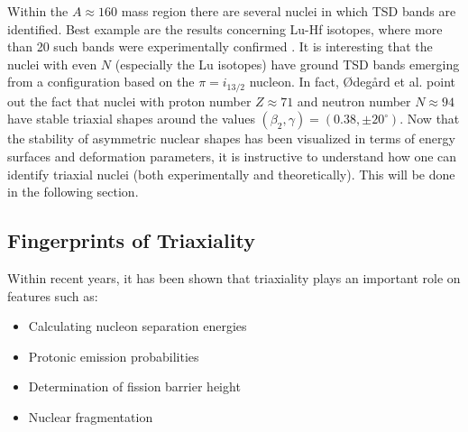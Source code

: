 Within the $A\approx160$ mass region there are several nuclei in which TSD bands are identified. Best example are the results concerning Lu-Hf isotopes, where more than 20 such bands were experimentally confirmed \cite{gu2007theoretical}. It is interesting that the nuclei with even $N$ (especially the Lu isotopes) have ground TSD bands emerging from a configuration based on the $\pi=i_{13/2}$ nucleon. In fact, Ødegård et al. \cite{odegaard2001evidence} point out the fact that nuclei with proton number $Z\approx 71$ and neutron number $N\approx 94$ have stable triaxial shapes around the values $(\beta_2,\gamma)=(0.38,\pm 20^\circ)$.
Now that the stability of asymmetric nuclear shapes has been visualized in terms of energy surfaces and deformation parameters, it is instructive to understand how one can identify triaxial nuclei (both experimentally and theoretically). This will be done in the following section.

\subsection{Fingerprints of Triaxiality}

Within recent years, it has been shown that triaxiality plays an important role on features such as:
\begin{itemize}
    \item Calculating nucleon separation energies \cite{moller2006global}
    \item Protonic emission probabilities \cite{qi2019recent,budaca2022deformation}
    \item Determination of fission barrier height \cite{moller2009heavy,lu2012potential}
    \item Nuclear fragmentation \cite{palumbo1985splitting}
\end{itemize}

